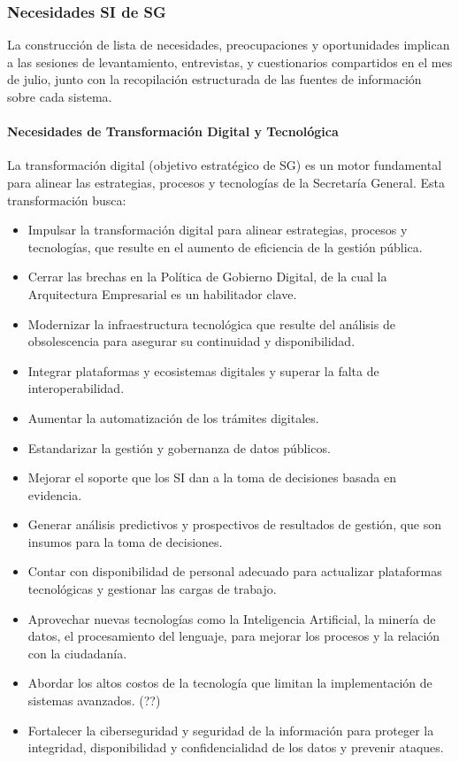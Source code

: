 \documentclass[
	a4paper, %
	12pt, %
]{include/CSSullivanBusinessReport}
\begin{document}
\subsubsection{Necesidades SI de SG}\label{sec:necesidades-si-de-sg}

La construcción de lista de necesidades, preocupaciones y oportunidades
implican a las sesiones de levantamiento, entrevistas, y cuestionarios
compartidos en el mes de julio, junto con la recopilación estructurada
de las fuentes de información sobre cada sistema.

\paragraph{Necesidades de Transformación Digital y
Tecnológica}\label{sec:necesidades-de-transformaciuxf3n-digital-y-tecnoluxf3gica}

La transformación digital (objetivo estratégico de SG) es un motor
fundamental para alinear las estrategias, procesos y tecnologías de la
Secretaría General. Esta transformación busca:

\begin{itemize}
\item
  Impulsar la transformación digital para alinear estrategias, procesos
  y tecnologías, que resulte en el aumento de eficiencia de la gestión
  pública.
\item
  Cerrar las brechas en la Política de Gobierno Digital, de la cual la
  Arquitectura Empresarial es un habilitador clave.
\item
  Modernizar la infraestructura tecnológica que resulte del análisis de
  obsolescencia para asegurar su continuidad y disponibilidad.
\item
  Integrar plataformas y ecosistemas digitales y superar la falta de
  interoperabilidad.
\item
  Aumentar la automatización de los trámites digitales.
\item
  Estandarizar la gestión y gobernanza de datos públicos.
\item
  Mejorar el soporte que los SI dan a la toma de decisiones basada en
  evidencia.
\item
  Generar análisis predictivos y prospectivos de resultados de gestión,
  que son insumos para la toma de decisiones.
\item
  Contar con disponibilidad de personal adecuado para actualizar
  plataformas tecnológicas y gestionar las cargas de trabajo.
\item
  Aprovechar nuevas tecnologías como la Inteligencia Artificial, la
  minería de datos, el procesamiento del lenguaje, para mejorar los
  procesos y la relación con la ciudadanía.
\item
  Abordar los altos costos de la tecnología que limitan la
  implementación de sistemas avanzados. (??)
\item
  Fortalecer la ciberseguridad y seguridad de la información para
  proteger la integridad, disponibilidad y confidencialidad de los datos
  y prevenir ataques.
\end{itemize}
\end{document}
